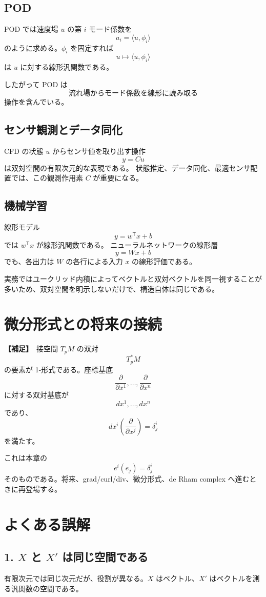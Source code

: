 \documentclass[a4paper,11pt]{ltjsarticle}
\newcommand{\suppitem}{\textbf{【補足】}}
\begin{document}
\subsection{POD}
POD では速度場 $u$ の第 $i$ モード係数を
\[
a_i=\langle u,\phi_i\rangle
\]
のように求める。$\phi_i$ を固定すれば
\[
u\mapsto\langle u,\phi_i\rangle
\]
は $u$ に対する線形汎関数である。

したがって POD は
\[
\boxed{\text{流れ場からモード係数を線形に読み取る}}
\]
操作を含んでいる。

\subsection{センサ観測とデータ同化}
CFD の状態 $u$ からセンサ値を取り出す操作
\[
y=Cu
\]
は双対空間の有限次元的な表現である。
状態推定、データ同化、最適センサ配置では、この観測作用素 $C$ が重要になる。

\subsection{機械学習}
線形モデル
\[
y=w^\mathsf{T}x+b
\]
では $w^\mathsf{T}x$ が線形汎関数である。
ニューラルネットワークの線形層
\[
y=Wx+b
\]
でも、各出力は $W$ の各行による入力 $x$ の線形評価である。

実務ではユークリッド内積によってベクトルと双対ベクトルを同一視することが多いため、双対空間を明示しないだけで、構造自体は同じである。

\section{微分形式との将来の接続}

\suppitem\ 接空間 $T_pM$ の双対
\[
T_p^*M
\]
の要素が 1-形式である。座標基底
\[
\frac{\partial}{\partial x^1},\dots,\frac{\partial}{\partial x^n}
\]
に対する双対基底が
\[
dx^1,\dots,dx^n
\]
であり、
\[
dx^i\left(\frac{\partial}{\partial x^j}\right)=\delta^i_j
\]
を満たす。

これは本章の
\[
e^i(e_j)=\delta^i_j
\]
そのものである。将来、grad/curl/div、微分形式、de Rham complex へ進むときに再登場する。

\section{よくある誤解}

\subsection*{1. $X$ と $X'$ は同じ空間である}
有限次元では同じ次元だが、役割が異なる。$X$ はベクトル、$X'$ はベクトルを測る汎関数の空間である。
\end{document}
